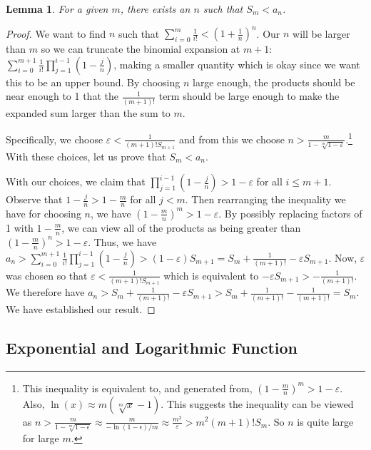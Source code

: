 \documentclass[12pt]{article}
\newtheorem{lemma}{Lemma}[subsection]
\theoremstyle{remark}
\begin{document}
\begin{lemma}\label{lem:snam}
For a given $m$, there exists an $n$ such that $S_m < a_n$.   
\end{lemma}

\begin{proof}
 We want to find $n$ such that $\sum_{i=0}^m \frac{1}{i!} < (1+\frac{1}{n})^n$. Our $n$ will be larger than $m$ so we can truncate the binomial expansion at $m+1$: $\sum_{i=0}^{m+1} \frac{1}{i!} \prod_{j=1}^{i-1} (1-\tfrac{j}{n})$, making a smaller quantity which is okay since we want this to be an upper bound. By choosing $n$ large enough, the products should be near enough to 1 that the $\frac{1}{(m+1)!}$ term should be large enough to make the expanded sum larger than the sum to $m$. 

 Specifically, we choose $\varepsilon < \frac{1}{(m+1)! S_{m+1}  }$ and from this we choose $n > \frac{m}{ 1 - \sqrt[m]{1-\varepsilon}}$.\footnote{This inequality is equivalent to, and generated from, $(1-\tfrac{m}{n})^m > 1 - \varepsilon$. Also, $\ln(x) \approx m (\sqrt[m]{x} -1)$. This suggests the inequality can be viewed as $n > \frac{m}{1 - \sqrt[m]{1-\epsilon}} \approx \frac{m}{-\ln(1 - \epsilon)/m} \approx \frac{m^2}{\varepsilon} > m^2 (m+1)! S_m$. So $n$ is quite large for large $m$.} With these choices, let us prove that $S_m < a_n$. 
 
 With our choices, we claim that $\prod_{j=1}^{i-1} (1-\tfrac{j}{n}) > 1-\varepsilon$ for all $i \leq m+1$. Observe that $1-\tfrac{j}{n} > 1 -\tfrac{m}{n}$ for all $j < m$. Then rearranging the inequality we have for choosing $n$, we have $(1 - \tfrac{m}{n})^m > 1 - \varepsilon $. By possibly replacing factors of 1 with $1-\tfrac{m}{n}$, we can view all of the products as being greater than $(1 - \tfrac{m}{n})^n > 1-\varepsilon$.  Thus, we have 
 $a_n >  \sum_{i=0}^{m+1} \frac{1}{i!} \prod_{j=1}^{i-1} (1-\tfrac{j}{n}) > (1-\varepsilon) S_{m+1} = S_m + \frac{1}{(m+1)!} - \varepsilon S_{m+1}$.  Now, $\varepsilon$ was chosen so that $\varepsilon < \frac{1}{(m+1)! S_{m+1}}$ which is equivalent to $- \varepsilon S_{m+1} > -\frac{1}{(m+1)!}$. We therefore have $a_n > S_m + \frac{1}{(m+1)!} - \varepsilon S_{m+1} > S_m + \frac{1}{(m+1)!} - \frac{1}{(m+1)!} = S_m$. We have established our result. 
\end{proof}


\subsection{Exponential and Logarithmic Function}
\end{document}
